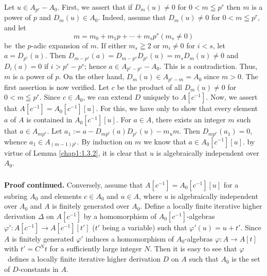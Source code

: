 \subsubsection{}\label{chap1:1.5.3}
\begin{proofoflemma*}[1.5 ]
Let $u\in A_{p^{r}}-A_{0}$. First, we assert that if $D_{m}(u)\neq 0$
for $0<m\leqq p^{r}$ then $m$ is a power of $p$ and $D_{m}(u)\in
A_{0}$. Indeed, assume that $D_{m}(u)\neq 0$ for $0<m\leqq p^{r}$, and
let
$$
m=m_{0}+m_{1}p+\cdots+m_{s}p^{s}(m_{s}\neq 0)
$$
be\pageoriginale\ the $p$-adic expansion of $m$. If either $m_{s}\geqq
2$ or $m_{i}\neq 0$ for $i<s$, let $a=D_{p^{s}}(u)$. Then
$D_{m-p^{s}}(a)=D_{m-p^{s}}D_{p^{s}}(u)=m_{s}D_{m}(u)\neq 0$ and
$D_{i}(a)=0$ if $i>p^{r}-p^{s}$; hence $a\in
A_{p^{r}-p^{s}}-A_{0}$. This is a contradiction. Thus, $m$ is a power
of $p$. On the other hand, $D_{m}(u)\in A_{p^{r}-m}=A_{0}$ since
$m>0$. The first assertion is now verified. Let $c$ be the product of
all $D_{m}(u)\neq 0$ for $0<m\leqq p^{r}$. Since $c\in A_{0}$, we can
extend $D$ uniquely to $A[c^{-1}]$. Now, we assert that
$A[c^{-1}]=A_{0}[c^{-1}][u]$. For this, we have only to show that
every element $a$ of $A$ is contained in $A_{0}[c^{-1}][u]$. For $a\in
A$, there exists an integer $m$ such that $a\in A_{mp^{r}}$. Let
$a_{1}:=a-D_{mp^{r}}(a)D_{p^{r}}(u)-m_{u}m$. Then
$D_{mp^{r}}(a_{1})=0$, whence $a_{1}\in A_{(m-1)p^{r}}$. By induction
on $m$ we know that $a\in A_{0}[c^{-1}][u]$. by virtue of Lemma
\ref{chap1:1.3.2}, it is clear that $u$ is algebraically independent over $A_{0}$.
\end{proofoflemma*}


\subsubsection{}\label{chap1:1.5.4}
\textbf{Proof continued.}
Conversely, assume that $A[c^{-1}]=A_{0}[c^{-1}][u]$ for a subring
$A_{0}$ and elements $c\in A_{0}$ and $u\in A$, where $u$ is
algebraically independent over $A_{0}$ and $A$ is finitely generated
over $A_{0}$. Define a locally finite iterative higher derivation
$\Delta$ on $A[c^{-1}]$ by a homomorphism of $A_{0}[c^{-1}]$-algebras
$\varphi':A[c^{-1}]\to A[c^{-1}][t']$ ($t'$ being a variable) such
that $\varphi'(u)=u+t'$. Since $A$ is finitely generated $\varphi'$
induces a homomorphism of $A_{0}$-algebras $\varphi:A\to A[t]$ with
$t'=C^{N}t$ for a sufficiently large integer $N$. Then it is easy to
see that $\varphi$\pageoriginale\ defines a locally finite iterative
higher derivation $D$ on $A$ such that $A_{0}$ is the set of
$D$-constants in $A$. 


